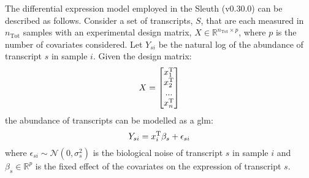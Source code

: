 The differential expression model employed in the Sleuth (v0.30.0) \cite{pimentelDifferentialAnalysisRNAseq2017,yiGenelevelDifferentialAnalysis2018} can be described as follows.
Consider a set of transcripts, $S$, that are each measured in $n_\mathrm{Tot}$ samples with an experimental design matrix, $X \in \mathbb{R}^{n_\mathrm{Tot} \times p}$, where $p$ is the number of covariates considered.
Let $Y_{si}$ be the natural log of the abundance of transcript $s$ in sample $i$.
Given the design matrix:
%
\begin{equation}
  X = \begin{bmatrix}
    x_1^{\mathrm{T}} \\
    x_2^{\mathrm{T}} \\
    ... \\
    x_n^{\mathrm{T}}
  \end{bmatrix}
\end{equation}
%
the abundance of transcripts can be modelled as a \gls{glm}:
%
\begin{equation}
  Y_{si} = x_i^{\mathrm{T}} \beta_s + \epsilon_{si}
\end{equation}
%
where $\epsilon_{si} \sim \mathcal{N}(0, \sigma_s^2)$ is the biological noise of transcript $s$ in sample $i$ and $\beta_s \in \mathbb{R}^p$ is the fixed effect of the covariates on the expression of transcript $s$.

